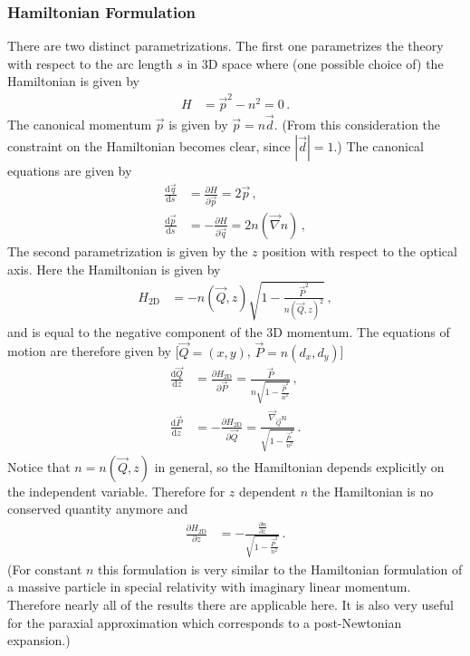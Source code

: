 \documentclass[12pt,a4paper,twoside,openright,BCOR10mm,headsepline,titlepage,abstracton,chapterprefix,final]{scrreprt}
\begin{document}
\subsubsection{Hamiltonian Formulation}
There are two distinct parametrizations. The first one parametrizes the theory with respect to the
arc length $s$ in 3D space where (one possible choice of) the Hamiltonian is given by
\begin{align}
 H &= \vec{p}^2 - n^2 = 0\,.
\end{align}
The canonical momentum $\vec{p}$ is given by $\vec{p} = n \vec{d}$. (From this consideration the constraint on
the Hamiltonian becomes clear, since $|\vec{d}| = 1$.) The canonical equations are given by
\begin{align}
 \frac{\text{d}\vec{q}}{\text{d}s} &= \frac{\partial H}{\partial \vec{p}} = 2 \vec{p}\,,\\
 \frac{\text{d}\vec{p}}{\text{d}s} &= -\frac{\partial H}{\partial \vec{q}} = 2 n (\vec{\nabla} n)\,, 
\end{align}
The second parametrization is given by the $z$ position with respect to the optical axis. Here the Hamiltonian is
given by
\begin{align}
 H_{\text{2D}} &= -n(\vec{Q}, z)\sqrt{1 - \frac{\vec{P}^2}{n(\vec{Q}, z)^2}}\,,
\end{align}
and is equal to the negative component of the 3D momentum.
The equations of motion are therefore given by [$\vec{Q} = (x,y)$, $\vec{P} = n (d_x, d_y)$]
\begin{align}
 \frac{\text{d}\vec{Q}}{\text{d}z} &= \frac{\partial H_{\text{2D}}}{\partial \vec{P}} = \frac{\vec{P}}{n \sqrt{1 - \frac{\vec{P}^2}{n^2}}}\,,\\
 \frac{\text{d}\vec{P}}{\text{d}z} &= -\frac{\partial H_{\text{2D}}}{\partial \vec{Q}} = \frac{\vec{\nabla}_{\vec{Q}} n}{\sqrt{1 - \frac{\vec{P}^2}{n^2}}}\,.    
\end{align}
Notice that $n = n(\vec{Q}, z)$ in general, so the Hamiltonian depends explicitly on the independent variable.
Therefore for $z$ dependent $n$ the Hamiltonian is no conserved quantity anymore and
\begin{align}
 \frac{\partial H_{\text{2D}}}{\partial z} &= -\frac{\frac{\partial n}{\partial z}}{\sqrt{1 - \frac{\vec{P}^2}{n^2}}}\,.
\end{align}
(For constant $n$ this formulation is very similar to the Hamiltonian formulation of a 
massive particle in special relativity with imaginary linear momentum.
Therefore nearly all of the results there are applicable here. It is also very useful 
for the paraxial approximation which corresponds to a post-Newtonian expansion.)
\end{document}
